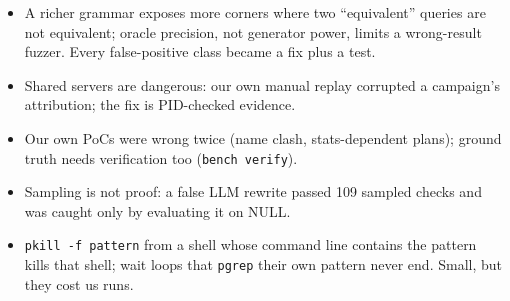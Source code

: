\begin{warnbox}
\begin{itemize}
  \item A richer grammar exposes more corners where two ``equivalent'' queries
    are not equivalent; oracle precision, not generator power, limits a
    wrong-result fuzzer. Every false-positive class became a fix plus a test.
  \item Shared servers are dangerous: our own manual replay corrupted a
    campaign's attribution; the fix is PID-checked evidence.
  \item Our own PoCs were wrong twice (name clash, stats-dependent plans);
    ground truth needs verification too (\texttt{bench verify}).
  \item Sampling is not proof: a false LLM rewrite passed 109 sampled checks
    and was caught only by evaluating it on NULL.
  \item \texttt{pkill -f pattern} from a shell whose command line contains the
    pattern kills that shell; wait loops that \texttt{pgrep} their own pattern
    never end. Small, but they cost us runs.
\end{itemize}
\end{warnbox}
